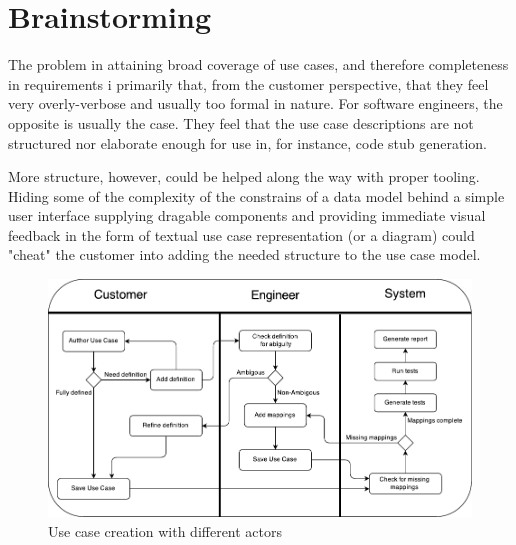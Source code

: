 \documentclass[10pt]{scrreprt}
\begin{document}

\section{Brainstorming}
The problem in attaining broad coverage of use cases, and therefore completeness in requirements i primarily that, from the customer perspective, that they feel very overly-verbose and usually too formal in nature. For software engineers, the opposite is usually the case. They feel that the use case descriptions are not structured nor elaborate enough for use in, for instance, code stub generation.

More structure, however, could be helped along the way with proper tooling. Hiding some of the complexity of the constrains of a data model behind a simple user interface supplying dragable components and providing immediate visual feedback in the form of textual use case representation (or a diagram) could "cheat" the customer into adding the needed structure to the use case model.

\begin{figure}[h]
\includegraphics[scale=0.9]{img/use_case_creation_activity_diagram}
\centering
\caption{Use case creation with different actors}
\label{fig:use_case_creation_activity_diagram}
\end{figure}
\end{document}
